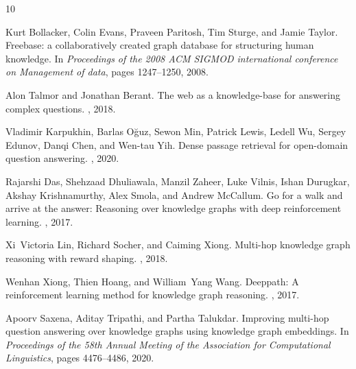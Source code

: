 \documentclass[11pt,a4paper]{article}
\begin{document}
\begin{thebibliography}{10}

Kurt Bollacker, Colin Evans, Praveen Paritosh, Tim Sturge, and Jamie Taylor.
\newblock Freebase: a collaboratively created graph database for structuring human knowledge.
\newblock In {\em Proceedings of the 2008 ACM SIGMOD international conference on Management of data}, pages 1247--1250, 2008.

Alon Talmor and Jonathan Berant.
\newblock The web as a knowledge-base for answering complex questions.
, 2018.

Vladimir Karpukhin, Barlas O{\u{g}}uz, Sewon Min, Patrick Lewis, Ledell Wu, Sergey Edunov, Danqi Chen, and Wen-tau Yih.
\newblock Dense passage retrieval for open-domain question answering.
, 2020.

Rajarshi Das, Shehzaad Dhuliawala, Manzil Zaheer, Luke Vilnis, Ishan Durugkar, Akshay Krishnamurthy, Alex Smola, and Andrew McCallum.
\newblock Go for a walk and arrive at the answer: Reasoning over knowledge graphs with deep reinforcement learning.
, 2017.

Xi~Victoria Lin, Richard Socher, and Caiming Xiong.
\newblock Multi-hop knowledge graph reasoning with reward shaping.
, 2018.

Wenhan Xiong, Thien Hoang, and William~Yang Wang.
\newblock Deeppath: A reinforcement learning method for knowledge graph reasoning.
, 2017.

Apoorv Saxena, Aditay Tripathi, and Partha Talukdar.
\newblock Improving multi-hop question answering over knowledge graphs using knowledge graph embeddings.
\newblock In {\em Proceedings of the 58th Annual Meeting of the Association for Computational Linguistics}, pages 4476--4486, 2020.

\end{thebibliography}


\appendix
\end{document}
